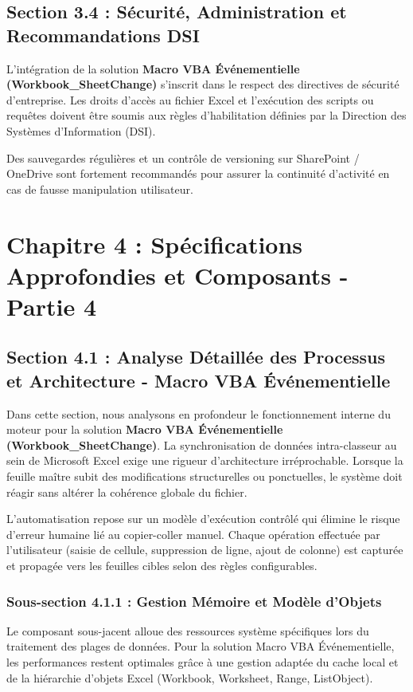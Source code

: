\documentclass[12pt,a4paper]{report}
\begin{document}
\section{Section 3.4 : Sécurité, Administration et Recommandations DSI}
L'intégration de la solution \textbf{Macro VBA Événementielle (Workbook\_SheetChange)} s'inscrit dans le respect des directives de sécurité d'entreprise. Les droits d'accès au fichier Excel et l'exécution des scripts ou requêtes doivent être soumis aux règles d'habilitation définies par la Direction des Systèmes d'Information (DSI).

Des sauvegardes régulières et un contrôle de versioning sur SharePoint / OneDrive sont fortement recommandés pour assurer la continuité d'activité en cas de fausse manipulation utilisateur.


\chapter{Chapitre 4 : Spécifications Approfondies et Composants - Partie 4}

\section{Section 4.1 : Analyse Détaillée des Processus et Architecture - Macro VBA Événementielle}
Dans cette section, nous analysons en profondeur le fonctionnement interne du moteur pour la solution \textbf{Macro VBA Événementielle (Workbook\_SheetChange)}. La synchronisation de données intra-classeur au sein de Microsoft Excel exige une rigueur d'architecture irréprochable. Lorsque la feuille maître subit des modifications structurelles ou ponctuelles, le système doit réagir sans altérer la cohérence globale du fichier.

L'automatisation repose sur un modèle d'exécution contrôlé qui élimine le risque d'erreur humaine lié au copier-coller manuel. Chaque opération effectuée par l'utilisateur (saisie de cellule, suppression de ligne, ajout de colonne) est capturée et propagée vers les feuilles cibles selon des règles configurables.


\subsection{Sous-section 4.1.1 : Gestion Mémoire et Modèle d'Objets}
Le composant sous-jacent alloue des ressources système spécifiques lors du traitement des plages de données. Pour la solution Macro VBA Événementielle, les performances restent optimales grâce à une gestion adaptée du cache local et de la hiérarchie d'objets Excel (Workbook, Worksheet, Range, ListObject).
\end{document}
